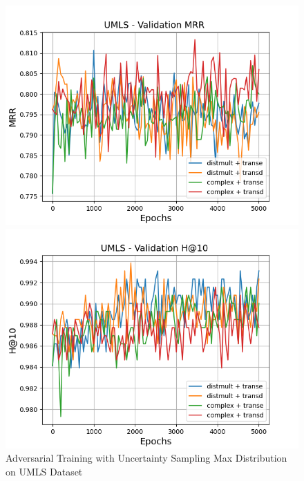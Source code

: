 \begin{figure}
\begin{minipage}{.5\textwidth}
      \includegraphics[width=0.9\linewidth]{figures/results/gan_train/pretrained/uncertainty/max_distribution/entropy/umls/gan_train_uncertainty_umls_mrrs.png}
    \end{minipage}%
    \begin{minipage}{.5\textwidth}
      \centering
      \includegraphics[width=0.9\linewidth]{figures/results/gan_train/pretrained/uncertainty/max_distribution/entropy/umls/gan_train_uncertainty_umls_hit10s.png}
    \end{minipage}%
    \caption{Adversarial Training with Uncertainty Sampling Max Distribution on \textsc{UMLS} Dataset}
    \label{fig:test}
\end{figure}